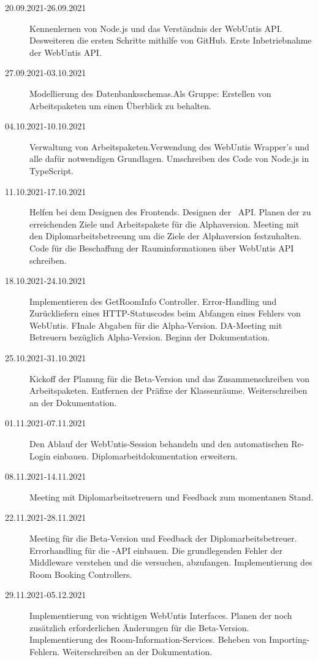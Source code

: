 
\begin{description}
    \item[20.09.2021-26.09.2021] Kennenlernen von Node.js und das Verständnis der WebUntis API. Desweiteren die ersten Schritte mithilfe von GitHub. Erste Inbetriebnahme der WebUntis API. 
    \item[27.09.2021-03.10.2021] Modellierung des Datenbanksschemas.Als Gruppe: Erstellen von Arbeitspaketen um einen Überblick zu behalten.
    \item[04.10.2021-10.10.2021] Verwaltung von Arbeitspaketen.Verwendung des WebUntis Wrapper's und alle dafür notwendigen Grundlagen. Umschreiben des Code von Node.js in TypeScript.
    \item[11.10.2021-17.10.2021] Helfen bei dem Designen des Frontends. Designen der \ZELIA\ API. Planen der zu erreichenden Ziele und Arbeitspakete für die Alphaversion. Meeting mit den Diplomarbeitsbetreeung um die Ziele der Alphaversion festzuhalten. Code für die Beschaffung der Rauminformationen über WebUntis API schreiben. 
    \item[18.10.2021-24.10.2021] Implementieren des GetRoomInfo Controller. Error-Handling und Zurückliefern eines HTTP-Statuscodes beim Abfangen eines Fehlers von WebUntis. FInale Abgaben für die Alpha-Version. DA-Meeting mit Betreuern bezüglich Alpha-Version. Beginn der Dokumentation.
    \item[25.10.2021-31.10.2021] Kickoff der Planung für die Beta-Version und das Zusammenschreiben von Arbeitspaketen. Entfernen der Präfixe der Klassenräume. Weiterschreiben an der Dokumentation.
    \item[01.11.2021-07.11.2021] Den Ablauf der WebUntis-Session behandeln und den automatischen Re-Login einbauen. Diplomarbeitdokumentation erweitern. 
    \item[08.11.2021-14.11.2021] Meeting mit Diplomarbeitsetreuern und Feedback zum momentanen Stand.
    \item[22.11.2021-28.11.2021] Meeting für die Beta-Version und Feedback der Diplomarbeitsbetreuer. Errorhandling für die \ZELIA-API einbauen. Die grundlegenden Fehler der Middleware verstehen und die versuchen, abzufangen. Implementierung des Room Booking Controllers. 
    \item[29.11.2021-05.12.2021] Implementierung von wichtigen WebUntis Interfaces. Planen der noch zusätzlich erforderlichen Änderungen für die Beta-Version. Implementierung des Room-Information-Services. Beheben von Importing-Fehlern. Weiterschreiben an der Dokumentation.

\end{description}

